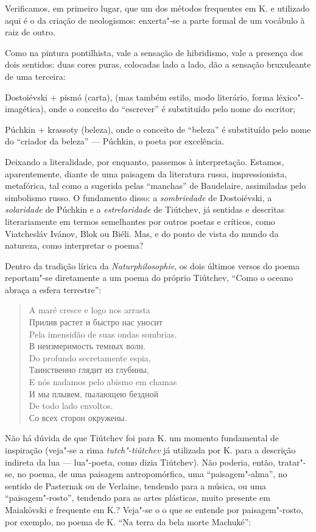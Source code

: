 Verificamos, em primeiro lugar, que um dos métodos frequentes em K. e
utilizado aqui é o da criação de neologismos: enxerta"-se a parte formal
de um vocábulo à raiz de outro.

Como na pintura pontilhista, vale a sensação de hibridismo, vale a
presença dos dois sentidos: duas cores puras, colocadas lado a lado, dão a
sensação bruxuleante de uma terceira:

Dostoiévski + pismó (carta), (mas também estilo, modo literário, forma
léxico"-imagética), onde o conceito do ``escrever'' é substituído pelo
nome do escritor;

Púchkin + krassoty (beleza), onde o conceito de ``beleza'' é substituído
pelo nome do ``criador da beleza'' --- Púchkin, o poeta por excelência.

Deixando a literalidade, por enquanto, passemos à interpretação.
Estamos, aparentemente, diante de uma paisagem da literatura russa,
impressionista, metafórica, tal como a sugerida pelas ``manchas'' de
Baudelaire, assimiladas pelo simbolismo russo. O fundamento disso: a
\emph{sombriedade} de Dostoiévski, a \emph{solaridade} de Púchkin e a
\emph{estrelaridade} de Tiútchev, já sentidas e descritas literariamente
em termos semelhantes por outros poetas e críticos, como Viatchesláv
Ivánov, Blok ou Biéli. Mas, e do ponto de vista do mundo da natureza,
como interpretar o poema?

Dentro da tradição lírica da \emph{Naturphilosophie}, os dois últimos
versos do poema reportam"-se diretamente a um poema do próprio Tiútchev,
``Como o oceano abraça a esfera terrestre'':

\begin{verse}
A maré cresce e logo nos arrasta \\
Прилив растет и быстро нас уносит \\[8pt]
Pela imensidão de suas ondas sombrias. \\
В неизмеримость темных волн. \\[8pt]
Do profundo secretamente espia, \\
Таинственно глядит из глубины, \\[8pt]
E nós nadamos pelo abismo em chamas \\
И мы плывем, пылающею бездной \\[8pt]
De todo lado envoltos. \\
Со всех сторон окружены.
\end{verse}

Não há dúvida de que Tiútchev foi para K. um momento fundamental de
inspiração (veja"-se a rima \emph{tutch"-tiútchev} já utilizada por
K. para a descrição indireta da lua --- lua"-poeta, como dizia Tiútchev).
Não poderia, então, tratar"-se, no poema, de uma paisagem
antropomórfica, uma ``paisagem"-alma'', no sentido de Pasternak ou de
Verlaine, tendendo para a música, ou uma ``paisagem"-rosto'', tendendo para
as artes plásticas, muito presente em Maiakóvski e frequente em K.?
Veja"-se o o que se entende por paisagem"-rosto, por exemplo, no poema de
K. ``Na terra da bela morte Machuké'':

